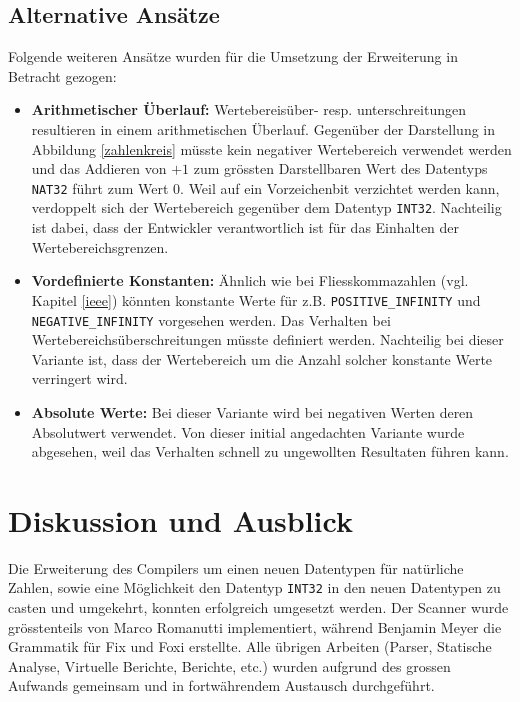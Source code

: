 \documentclass[10pt, a4paper, twocolumn]{article} %
\begin{document}
\subsection{Alternative Ansätze}
Folgende weiteren Ansätze wurden für die Umsetzung der Erweiterung in Betracht gezogen:

\begin{itemize}
    \item \textbf{Arithmetischer Überlauf:} Wertebereisüber- resp. unterschreitungen resultieren in einem arithmetischen Überlauf. Gegenüber der Darstellung in Abbildung \ref{zahlenkreis} müsste kein negativer Wertebereich verwendet werden und das Addieren von $+ 1$ zum grössten Darstellbaren Wert des Datentyps \texttt{NAT32} führt zum Wert $0$. Weil auf ein Vorzeichenbit verzichtet werden kann, verdoppelt sich der Wertebereich gegenüber dem Datentyp \texttt{INT32}. Nachteilig ist dabei, dass der Entwickler verantwortlich ist für das Einhalten der Wertebereichsgrenzen.
    \item \textbf{Vordefinierte Konstanten:} Ähnlich wie bei Fliesskommazahlen (vgl. Kapitel \ref{ieee}) könnten konstante Werte für z.B. \texttt{POSITIVE\_INFINITY} und \texttt{NEGATIVE\_INFINITY} vorgesehen werden. Das Verhalten bei Wertebereichsüberschreitungen müsste definiert werden. Nachteilig bei dieser Variante ist, dass der Wertebereich um die Anzahl solcher konstante Werte verringert wird.
    \item \textbf{Absolute Werte:} Bei dieser Variante wird bei negativen Werten deren Absolutwert verwendet. Von dieser initial angedachten Variante wurde abgesehen, weil das Verhalten schnell zu ungewollten Resultaten führen kann.
\end{itemize}

\section{Diskussion und Ausblick}
Die Erweiterung des Compilers um einen neuen Datentypen für natürliche Zahlen, sowie eine Möglichkeit den Datentyp \texttt{INT32} in den neuen Datentypen zu casten und umgekehrt, konnten erfolgreich umgesetzt werden.
Der Scanner wurde grösstenteils von Marco Romanutti implementiert, während Benjamin Meyer die Grammatik für Fix und Foxi erstellte.
Alle übrigen Arbeiten (Parser, Statische Analyse, Virtuelle Berichte, Berichte, etc.) wurden aufgrund des grossen Aufwands gemeinsam und in fortwährendem Austausch durchgeführt.
\end{document}
